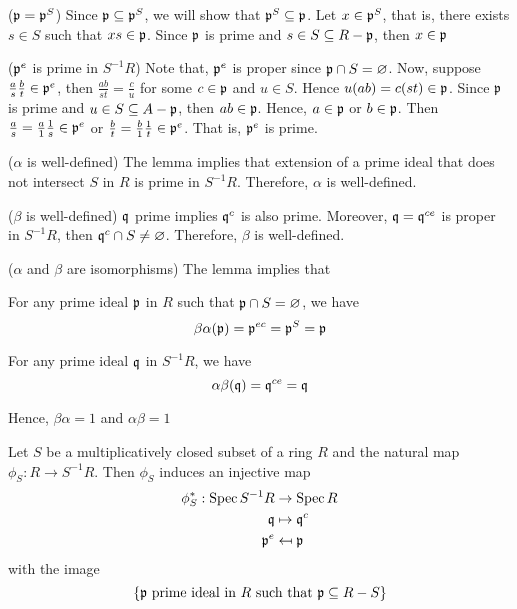 \begin{longproof}
	($\mathfrak{p} = \mathfrak{p}^S$) Since $\mathfrak{p} \subseteq \mathfrak{p}^S$, we will show that $\mathfrak{p}^S \subseteq \mathfrak{p}$. Let $x \in \mathfrak{p}^S$, that is, there exists $s \in S$ such that $xs \in \mathfrak{p}$. Since $\mathfrak{p}$ is prime and $s \in S \subseteq R - \mathfrak{p}$, then $x \in \mathfrak{p}$
	
	($\mathfrak{p}^e$ is prime in $S^{-1}R$) Note that, $\mathfrak{p}^e$ is proper since $\mathfrak{p} \cap S = \varnothing$. Now, suppose $\frac{a}{s} \frac{b}{t} \in \mathfrak{p}^e$, then $\frac{ab}{st} = \frac{c}{u}$ for some $c \in \mathfrak{p}$ and $u \in S$. Hence $u(ab) = c(st) \in \mathfrak{p}$. Since $\mathfrak{p}$ is prime and $u \in S \subseteq A - \mathfrak{p}$, then $ab \in \mathfrak{p}$. Hence, $a \in \mathfrak{p}$ or $b \in \mathfrak{p}$. Then $\frac{a}{s} = \frac{a}{1} \frac{1}{s} \in \mathfrak{p}^e$ or $\frac{b}{t} = \frac{b}{1} \frac{1}{t} \in \mathfrak{p}^e$. That is, $\mathfrak{p}^e$ is prime.
\end{longproof}

\begin{longproof}
	($\alpha$ is well-defined) The lemma implies that extension of a prime ideal that does not intersect $S$ in $R$ is prime in $S^{-1} R$. Therefore, $\alpha$ is well-defined.
	
	($\beta$ is well-defined) $\mathfrak{q}$ prime implies $\mathfrak{q}^c$ is also prime. Moreover, $\mathfrak{q} = \mathfrak{q}^{ce}$ is proper in $S^{-1} R$, then $\mathfrak{q}^c \cap S \neq \varnothing$. Therefore, $\beta$ is well-defined.
	
	($\alpha$ and $\beta$ are isomorphisms) The lemma implies that 
	
	For any prime ideal $\mathfrak{p}$ in $R$ such that $\mathfrak{p} \cap S = \varnothing$, we have
	$$
		\beta \alpha (\mathfrak{p}) = \mathfrak{p}^{ec} = \mathfrak{p}^S = \mathfrak{p}
	$$
	
	For any prime ideal $\mathfrak{q}$ in $S^{-1} R$, we have
	$$
		\alpha \beta (\mathfrak{q}) = \mathfrak{q}^{ce} = \mathfrak{q}
	$$
	
	Hence, $\beta \alpha = 1$ and $\alpha \beta = 1$
\end{longproof}

\begin{remark}
	Let $S$ be a multiplicatively closed subset of a ring $R$ and the natural map $\phi_S: R \to S^{-1} R$. Then $\phi_S$ induces an injective map
	\begin{align*}
		\phi_S^*: \operatorname{Spec} S^{-1} R &\to \operatorname{Spec} R \\
								\mathfrak{q} &\mapsto \mathfrak{q}^c \\
								\mathfrak{p}^e &\mapsfrom \mathfrak{p}
	\end{align*}
	with the image 
	$$
		\{\text{$\mathfrak{p}$ prime ideal in $R$ such that $\mathfrak{p} \subseteq R - S$}\}
	$$
\end{remark}

